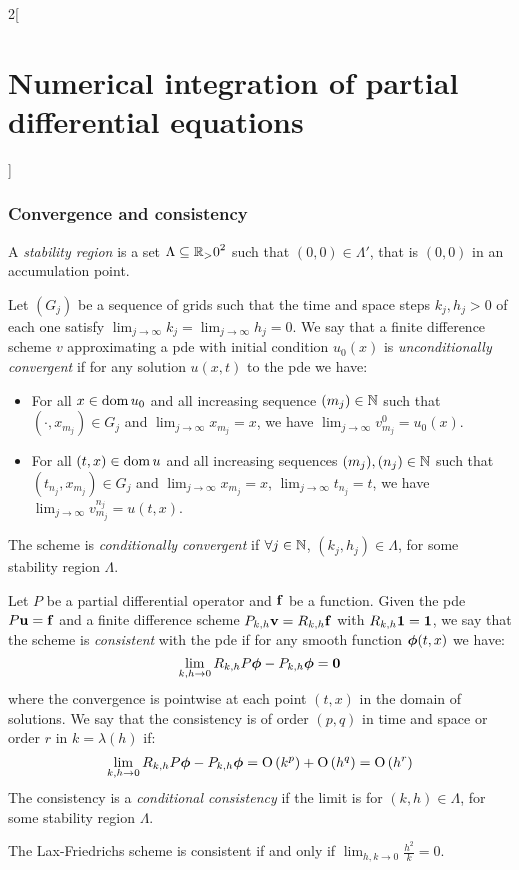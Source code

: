 \documentclass[../../../main_math.tex]{subfiles}
\begin{document}
\begin{multicols}{2}[\section{Numerical integration of partial differential equations}]
  \subsubsection{Convergence and consistency}
  \begin{definition}
    A \emph{stability region} is a set $\Lambda\subseteq{\ensuremath{\mathbb{R}}_>0}^2$ such that $(0,0)\in\Lambda'$, that is $(0,0)$ in an accumulation point.
  \end{definition}
  \begin{definition}
    Let $(G_j)$ be a sequence of grids such that the time and space steps $k_j,h_j>0$ of each one satisfy $\displaystyle \lim_{j\to\infty}k_j=\lim_{j\to\infty}h_j=0$.
    We say that a finite difference scheme $v$ approximating a pde with initial condition $u_0(x)$ is \emph{unconditionally convergent} if for any solution $u(x,t)$ to the pde we have:
    \begin{itemize}
      \item For all $x\in\operatorname{dom} u_0$ and all increasing sequence $(m_j)\in\mathbb{N}$ such that $(\cdot,x_{m_j})\in G_j$ and $\displaystyle\lim_{j\to\infty} x_{m_j}=x$, we have $\displaystyle\lim_{j\to\infty} v_{m_j}^0=u_0(x)$.
      \item For all $(t,x)\in\operatorname{dom} u$ and all increasing sequences $(m_j),(n_j)\in\mathbb{N}$ such that $(t_{n_j},x_{m_j})\in G_j$ and $\displaystyle\lim_{j\to\infty} x_{m_j}=x$, $\displaystyle\lim_{j\to\infty} t_{n_j}=t$, we have $\displaystyle\lim_{j\to\infty} v_{m_j}^{n_j}=u(t,x)$.
    \end{itemize}
    The scheme is \emph{conditionally convergent} if $\forall j\in\mathbb{N}$, $(k_j,h_j)\in\Lambda$, for some stability region $\Lambda$.
  \end{definition}
  \begin{definition}
    Let $P$ be a partial differential operator and $\boldsymbol{\mathrm{f}}$ be a function. Given the pde $P\boldsymbol{\mathrm{u}}=\boldsymbol{\mathrm{f}}$ and a finite difference scheme $P_{k,h}\boldsymbol{\mathrm{v}}=R_{k,h}\boldsymbol{\mathrm{f}}$ with $R_{k,h}\boldsymbol{\mathrm{1}}=\boldsymbol{\mathrm{1}}$, we say that the scheme is \emph{consistent} with the pde if for any smooth function $\boldsymbol{\mathrm{\phi}}(t,x)$ we have: $$\lim_{k,h\to 0}R_{k,h}P\boldsymbol{\mathrm{\phi}}-P_{k,h}\boldsymbol{\mathrm{\phi}}=\boldsymbol{\mathrm{0}}$$
    where the convergence is pointwise at each point $(t,x)$ in the domain of solutions. We say that the consistency is of order $(p,q)$ in time and space or order $r$ in $k=\lambda(h)$ if: $$\lim_{k,h\to 0}R_{k,h}P\boldsymbol{\mathrm{\phi}}-P_{k,h}\boldsymbol{\mathrm{\phi}}=\mathrm{O}\left(k^p\right)+\mathrm{O}\left(h^q\right)=\mathrm{O}\left(h^r\right)$$  The consistency is a \emph{conditional consistency} if the limit is for $(k,h)\in \Lambda$, for some stability region $\Lambda$.
  \end{definition}
  \begin{lemma}
    The Lax-Friedrichs scheme is consistent if and only if $\displaystyle\lim_{h,k\to 0}\frac{h^2}{k}=0$.
  \end{lemma}

\end{multicols}
\end{document}

